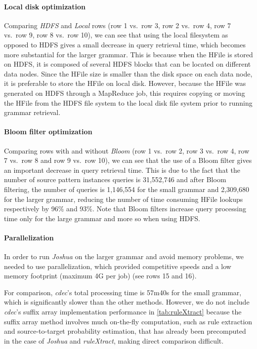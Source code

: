 \paragraph{Local disk optimization} Comparing \emph{HDFS} and \emph{Local} rows
    (row 1 vs.\ row 3, row 2 vs.\ row 4, row 7 vs.\ row 9, row 8 vs.\ row 10), we can
    see that using the local filesystem as opposed to HDFS gives a small
    decrease in query retrieval time, which becomes more
    substantial for the larger grammar.
    This is because when the HFile is stored on HDFS, it is composed of several
    HDFS blocks that can be located on different data nodes.
    Since the HFile size is smaller than the disk space on each data node, it is preferable
    to store the HFile on local disk. However, because the HFile was generated on
    HDFS through a MapReduce job, this
    requires copying or moving the HFile from the HDFS file system to the
    local disk file system prior to running grammar retrieval.
\paragraph{Bloom filter optimization} Comparing rows with and without \emph{Bloom}
    (row 1 vs.\ row 2, row 3 vs.\ row 4, row 7 vs.\ row 8 and row 9 vs.\ row 10), we can
    see that the
    use of a Bloom filter gives an important decrease in query retrieval time.
    This is due to the fact that the number of source pattern instances queries
    is 31,552,746 and after Bloom filtering, the number of queries is 1,146,554
    for the small grammar and 2,309,680 for the larger grammar, reducing the
    number of time consuming HFile lookups respectively by 96\% and 93\%. Note
    that Bloom filters increase query processing time only for the
    large grammar and more so when using HDFS.
\paragraph{Parallelization} In order to run \emph{Joshua} on the larger grammar and
    avoid memory problems, we needed to use parallelization, which provided
    competitive speeds and a low memory footprint (maximum 4G per job) (see rows
    15 and 16).

For comparison, \emph{cdec}'s total processing time is 57m40s for the small
grammar, which is significantly slower than the other methods. However, we do
not include \emph{cdec}'s suffix array implementation performance in
\autoref{tab:ruleXtract}
because the suffix array method involves much on-the-fly computation, such
as rule extraction and source-to-target probability estimation, that has
already been precomputed in the case of \emph{Joshua} and \emph{ruleXtract},
making direct comparison difficult.

